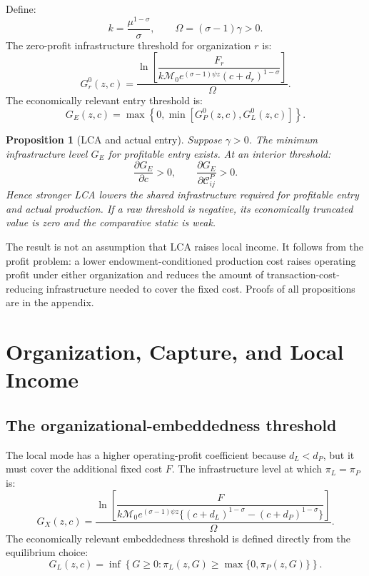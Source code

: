 \documentclass[11pt]{article}
\newtheorem{proposition}{Proposition}
\theoremstyle{definition}
\theoremstyle{remark}
\newcommand{\Mcal}{\mathcal M}
\begin{document}
Define:
\begin{equation}
 k=\frac{\mu^{1-\sigma}}{\sigma},
 \qquad
 \Omega=(\sigma-1)\gamma>0.
 \label{eq:k_omega}
\end{equation}
The zero-profit infrastructure threshold for organization \(r\) is:
\begin{equation}
 G_r^0(z,c)
 =
 \frac{
 \ln\left[
 \dfrac{F_r}
 {k\Mcal_0e^{(\sigma-1)\psi z}(c+d_r)^{1-\sigma}}
 \right]
 }{\Omega}.
 \label{eq:mode_entry_threshold}
\end{equation}
The economically relevant entry threshold is:
\begin{equation}
 G_E(z,c)=
 \max\left\{0,\min[G_P^0(z,c),G_L^0(z,c)]\right\}.
 \label{eq:entry_threshold}
\end{equation}

\begin{proposition}[LCA and actual entry]
\label{prop:entry}
Suppose \(\gamma>0\).  The minimum infrastructure level \(G_E\) for profitable
entry exists.  At an interior threshold:
\begin{equation}
 \frac{\partial G_E}{\partial c}>0,
 \qquad
\frac{\partial G_E}{\partial\mathcal C^P_{ij}}>0.
\label{eq:entry_lca_comparative_static}
\end{equation}
Hence stronger LCA lowers the shared infrastructure required for profitable
entry and actual production.  If a raw threshold is negative, its economically
truncated value is zero and the comparative static is weak.
\end{proposition}

The result is not an assumption that LCA raises local income.  It follows from
the profit problem: a lower endowment-conditioned production cost raises
operating profit under either organization and reduces the amount of
transaction-cost-reducing infrastructure needed to cover the fixed cost.
Proofs of all propositions are in the appendix.

\section{Organization, Capture, and Local Income}
\label{sec:organization}

\subsection{The organizational-embeddedness threshold}

The local mode has a higher operating-profit coefficient because
\(d_L<d_P\), but it must cover the additional fixed cost \(F\).  The
infrastructure level at which \(\pi_L=\pi_P\) is:
\begin{equation}
 G_X(z,c)
 =
 \frac{
 \ln\left[
 \dfrac{F}
 {k\Mcal_0e^{(\sigma-1)\psi z}
  \{(c+d_L)^{1-\sigma}-(c+d_P)^{1-\sigma}\}}
 \right]
 }{\Omega}.
 \label{eq:switch_threshold_raw}
\end{equation}
The economically relevant embeddedness threshold is defined directly from the
equilibrium choice:
\begin{equation}
 G_L(z,c)
 =
 \inf\left\{
 G\geq0:
 \pi_L(z,G)\geq\max\{0,\pi_P(z,G)\}
 \right\}.
 \label{eq:embedding_threshold}
\end{equation}
\end{document}
